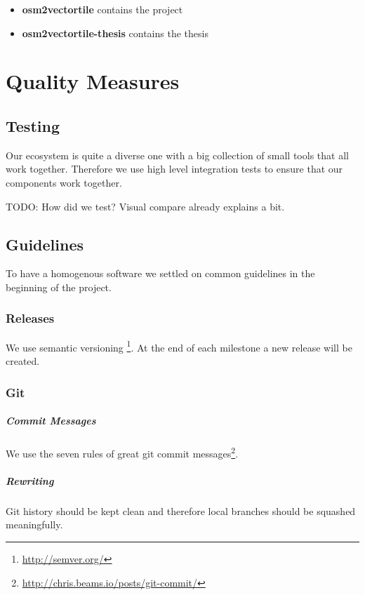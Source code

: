 \begin{itemize}
\item
  \textbf{osm2vectortile} contains the project
\item
  \textbf{osm2vectortile-thesis} contains the thesis
\end{itemize}

\newpage
\chapter{Quality Measures}\label{quality-measures}

\section{Testing}\label{testing}

Our ecosystem is quite a diverse one with a big collection of small
tools that all work together. Therefore we use high level integration
tests to ensure that our components work together.

TODO: How did we test? Visual compare already explains a bit.

\section{Guidelines}\label{guidelines}
To have a homogenous software we settled on common guidelines in 
the beginning of the project.

\subsection{Releases}
We use semantic versioning \footnote{\url{http://semver.org/}}. At the
end of each milestone a new release will be created.

\subsection{Git}\label{git}
\paragraph{Commit Messages}
We use the seven rules of great git commit
messages\footnote{\url{http://chris.beams.io/posts/git-commit/}}.

\paragraph{Rewriting}
Git history should be kept clean and therefore local branches should be
squashed meaningfully.

